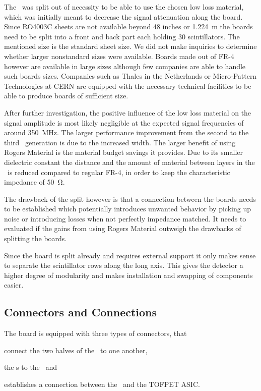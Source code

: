 \documentclass[../BTOF_summary.tex]{subfiles}
\begin{document}
The \railboard\ was split out of necessity to be able to use the chosen low loss material, which was initially meant to decrease the signal attenuation along the board.
Since RO4003C sheets are not available beyond 48 inches or \SI{1.224}{m} the boards need to be split into a front and back part each holding 30 scintillators.
The mentioned size is the standard sheet size.
We did not make inquiries to determine whether larger nonstandard sizes were available.
Boards made out of FR-4 however are available in large sizes although few companies are able to handle such boards sizes.
Companies such as Thales in the Netherlands or Micro-Pattern Technologies at CERN are equipped with the necessary technical facilities to be able to produce boards of sufficient size.

After further investigation, the positive influence of the low loss material on the signal amplitude is most likely negligible at the expected signal frequencies of around \SI{350}{MHz}.
The larger performance improvement from the second to the third \railboard\ generation is due to the increased width.
The larger benefit of using Rogers Material is the material budget savings it provides.
Due to its smaller dielectric constant the distance and the amount of material between layers in the \railboard\ is reduced compared to regular FR-4, in order to keep the characteristic impedance of \SI{50}{\ohm}.

The drawback of the split however is that a connection between the boards needs to be established which potentially introduces unwanted behavior by picking up noise or introducing losses when not perfectly impedance matched.
It needs to evaluated if the gains from using Rogers Material outweigh the drawbacks of splitting the boards.

Since the board is split already and requires external support it only makes sense to separate the scintillator rows along the long axis.
This gives the detector a higher degree of modularity and makes installation and swapping of components easier.

\subsection{Connectors and Connections}

The board is equipped with three types of connectors, that 
\begin{enumerate*}[label=\textbf{\Roman*})]
	\item  connect the two halves of the \railboard\ to one another, 
	\item the \sensorboard s to the \railboard\ and 
	\item establishes a connection between the \railboard\ and the TOFPET ASIC.
\end{enumerate*}
\end{document}
